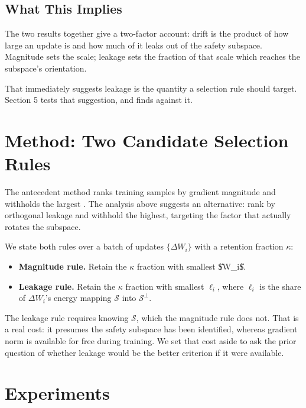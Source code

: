 \documentclass{article}
\begin{document}
\subsection{What This Implies}


The two results together give a two-factor account: drift is the product of how large an update is and how much of it leaks out of the safety subspace. Magnitude sets the scale; leakage sets the fraction of that scale which reaches the subspace's orientation.

That immediately suggests leakage is the quantity a selection rule should target. Section 5 tests that suggestion, and finds against it.




\section{Method: Two Candidate Selection Rules}


The antecedent method ranks training samples by gradient magnitude and withholds the largest \cite{arxiv_2604_17215}. The analysis above suggests an alternative: rank by orthogonal leakage and withhold the highest, targeting the factor that actually rotates the subspace.

We state both rules over a batch of updates $\{\Delta W_i\}$ with a retention fraction $\kappa$:

\begin{itemize}
  \item \textbf{Magnitude rule.} Retain the $\kappa$ fraction with smallest \$\|\Delta W\_i\|\$.
  \item \textbf{Leakage rule.} Retain the $\kappa$ fraction with smallest $\ell_i$, where $\ell_i$ is the share of $\Delta W_i$'s energy mapping $\mathcal{S}$ into $\mathcal{S}^{\perp}$.
\end{itemize}

The leakage rule requires knowing $\mathcal{S}$, which the magnitude rule does not. That is a real cost: it presumes the safety subspace has been identified, whereas gradient norm is available for free during training. We set that cost aside to ask the prior question of whether leakage would be the better criterion if it were available.




\section{Experiments}
\end{document}

